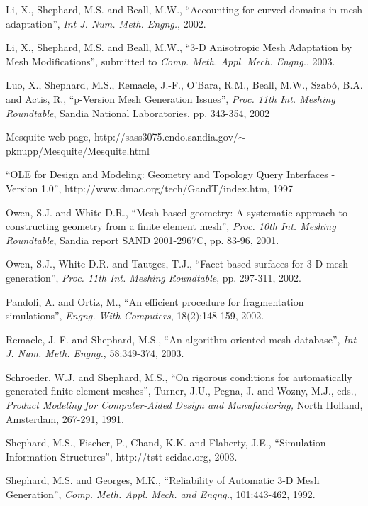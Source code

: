 \documentclass{article}
\begin{document}
\begin{thebibliography}{99}
 Li, X., Shephard, M.S. and Beall, M.W., ``Accounting 
for curved domains in mesh adaptation'', \textit{Int J. Num. Meth. 
Engng.}, 2002.

 Li, X., Shephard, M.S. and Beall, M.W., ``3-D Anisotropic 
Mesh Adaptation by Mesh Modifications'', submitted to \textit{Comp. 
Meth. Appl. Mech. Engng.}, 2003.

 Luo, X., Shephard, M.S., Remacle, J.-F., O'Bara, R.M., 
Beall, M.W., Szab\'{o}, B.A. and Actis, R., ``p-Version Mesh Generation 
Issues'', \textit{Proc. 11th Int. Meshing Roundtable}, Sandia 
National Laboratories, pp. 343-354, 2002

 Mesquite web page, http://sass3075.endo.sandia.gov/\ensuremath{\sim}pknupp/Mesquite/Mesquite.html

 ``OLE for Design and Modeling: Geometry and Topology 
Query Interfaces - Version 1.0'', http://www.dmac.org/tech/GandT/index.htm, 
1997

 Owen, S.J. and White D.R., ``Mesh-based geometry: A systematic 
approach to constructing geometry from a finite element mesh'', \textit{Proc. 
10th Int. Meshing Roundtable}, Sandia report SAND 2001-2967C, 
pp. 83-96, 2001.

 Owen, S.J., White D.R. and Tautges, T.J., ``Facet-based 
surfaces for 3-D mesh generation'', \textit{Proc. 11th Int. Meshing 
Roundtable}, pp. 297-311, 2002.

 Pandofi, A. and Ortiz, M., ``An efficient procedure for 
fragmentation simulations'', \textit{Engng. With Computers}, 
18(2):148-159, 2002.

 Remacle, J.-F. and Shephard, M.S., ``An algorithm oriented 
mesh database'', \textit{Int J. Num. Meth. Engng.}, 58:349-374, 
2003.

 Schroeder, W.J. and Shephard, M.S., ``On rigorous conditions 
for automatically generated finite element meshes'', Turner, J.U., 
Pegna, J. and Wozny, M.J., eds., \textit{Product Modeling for 
Computer-Aided Design and Manufacturing,} North Holland, Amsterdam, 
267-291, 1991.

 Shephard, M.S., Fischer, P., Chand, K.K. and Flaherty, 
J.E., ``Simulation Information Structures'', http://tstt-scidac.org, 
2003.

 Shephard, M.S. and Georges, M.K., ``Reliability of Automatic 
3-D Mesh Generation'', \textit{Comp. Meth. Appl. Mech. and Engng.}, 
101:443-462, 1992.


\end{thebibliography}
\end{document}
